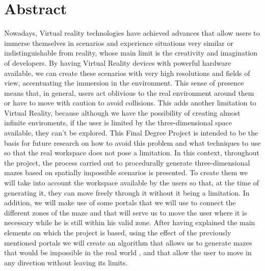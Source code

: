 \documentclass[a4paper]{report}
\begin{document}
\chapter*{Abstract} %


Nowadays, Virtual reality technologies have achieved advances that allow users to immerse themselves in scenarios and experience situations very similar or indistinguishable from reality, whose main limit is the creativity and imagination of developers. By having Virtual Reality devices with powerful hardware available, we can create these scenarios with very high resolutions and fields of view, accentuating the immersion in the environment.\vspace{2mm}\newline
This sense of presence means that, in general, users act oblivious to the real environment around them or have to move with caution to avoid collisions. This adds another limitation to Virtual Reality, because although we have the possibility of creating almost infinite enviroments, if the user is limited by the three-dimensional space available, they can't be explored. This Final Degree Project is intended to be the basis for future research on how to avoid this problem and what techniques to use so that the real workspace does not pose a limitation.\vspace{2mm}\newline
In this context, throughout the project, the process carried out to procedurally generate three-dimensional mazes based on spatially impossible scenarios is presented. To create them we will take into account the workspace available by the users so that, at the time of generating it, they can move freely through it without it being a limitation. In addition, we will make use of some portals that we will use to connect the different zones of the maze and that will serve us to move the user where it is necessary while he is still within his valid zone.\vspace{2mm}\newline
After having explained the main elements on which the project is based, using the effect of the previously mentioned portals we will create an algorithm that allows us to generate mazes that would be impossible in the real world , and that allow the user to move in any direction without leaving its limits.\vspace{2mm}\newline
\end{document}
